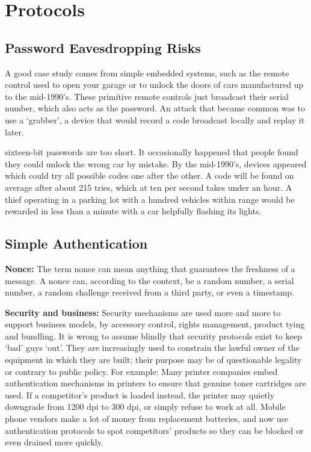 \chapter{Protocols}

\clearpage
\section{Password Eavesdropping Risks}
A good case study comes from simple embedded systems, such as the remote control used to open
your garage or to unlock the doors of cars manufactured up to the mid-1990’s.
These primitive remote controls just broadcast their serial number, which also
acts as the password. An attack that became common was to use a ‘grabber’, a device 
that would record a code broadcast locally and replay it later. 

sixteen-bit passwords are too short. It occasionally happened that people found they could unlock 
the wrong car by mistake. By the mid-1990’s, devices appeared which could try all
possible codes one after the other. A code will be found on average after about
215 tries, which at ten per second takes under an hour. A thief operating in a
parking lot with a hundred vehicles within range would be rewarded in less
than a minute with a car helpfully flashing its lights.



\section{Simple Authentication}

	{\bf Nonce:} The term nonce can mean anything that guarantees the freshness of a
	message. A nonce can, according to the context, be a random number, a serial
	number, a random challenge received from a third party, or even a timestamp.

	{\bf Security and business: } Security mechanisms are used more and more to support business 
	models, by accessory control, rights management, product tying and bundling. It is
	wrong to assume blindly that security protocols exist to keep ‘bad’ guys ‘out’.
	They are increasingly used to constrain the lawful owner of the equipment in
	which they are built; their purpose may be of questionable legality or contrary
	to public policy. For example: Many printer companies embed authentication mechanisms 
	in printers to ensure that genuine toner cartridges are used. If a competitor’s 
	product is loaded instead, the printer may quietly downgrade from 1200 dpi to 300 dpi, 
	or simply refuse to work at all. Mobile phone vendors make a lot of money from 
	replacement batteries, and now use authentication protocols to spot competitors’ 
	products so they can be blocked or even drained more quickly. 

